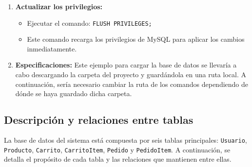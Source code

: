 \documentclass[10pt]{book}
\begin{document}
\begin{enumerate}
        \item \textbf{Actualizar los privilegios:}
        \begin{itemize}
            \item Ejecutar el comando: \lstinline{FLUSH PRIVILEGES;}
            \item Este comando recarga los privilegios de MySQL para aplicar los cambios inmediatamente.
        \end{itemize}
        \item \textbf{Especificaciones:} Este ejemplo para cargar la base de datos se llevaría a cabo descargando la carpeta del proyecto y guardándola en una ruta local. A continuación, sería necesario cambiar la ruta de los comandos dependiendo de dónde se haya guardado dicha carpeta.
        
    \end{enumerate}

        
\subsection{Descripción y relaciones entre tablas}

    La base de datos del sistema está compuesta por seis tablas principales: \texttt{Usuario}, \texttt{Producto}, \texttt{Carrito}, \texttt{CarritoItem}, \texttt{Pedido} y \texttt{PedidoItem}. A continuación, se detalla el propósito de cada tabla y las relaciones que mantienen entre ellas.
    
\end{document}
